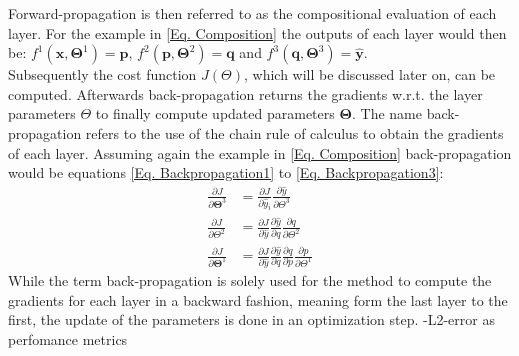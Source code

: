 \documentclass[12pt, a4paper]{article}
\begin{document}
\noindent
Forward-propagation is then referred to as the compositional evaluation of each layer. For the example in \cref{Eq. Composition} the outputs of each layer would then be:  \(f^1(\mathbf{x},\mathbf{\Theta}^1) = \mathbf{p}\), \(f^2(\mathbf{p},\mathbf{\Theta}^2) = \mathbf{q}\) and \(f^3(\mathbf{q},\mathbf{\Theta}^3) = \mathbf{\hat{y}}\).\\
Subsequently the cost function \(J(\Theta)\), which will be discussed later on, can be computed. Afterwards back-propagation returns the gradients w.r.t. the layer parameters \(\Theta\) to finally compute updated parameters \(\mathbf{\Theta}\).  The name back-propagation refers to the use of the chain rule of calculus to obtain the gradients of each layer. Assuming again the example in \cref{Eq. Composition} back-propagation would be equations \cref{Eq. Backpropagation1} to \cref{Eq. Backpropagation3}:
\begin{align}
	\frac{\partial J}{\partial \mathbf{\Theta}^3} &= \frac{\partial J}{\partial\hat{y}_i}\frac{\partial\hat{y}}{\partial \Theta^3}
\label{Eq. Backpropagation3}\\
	\frac{\partial J}{\partial \Theta^2} &= \frac{\partial J}{\partial\hat{y}}\frac{\partial\hat{y}}{\partial q}\frac{\partial q}{\partial \Theta^2}
\label{Eq. Backpropagation2}\\
	\frac{\partial J}{\partial \mathbf{\Theta}^1} &= \frac{\partial J}{\partial\hat{y}}\frac{\partial\hat{y}}{\partial q}\frac{\partial q}{\partial p}\frac{\partial p}{\partial \Theta^1}
\label{Eq. Backpropagation1}
\end{align}
While the term back-propagation is solely used for the method to compute the gradients for each layer in a backward fashion, meaning form the last layer to the first, the update of the parameters is done in an optimization step.
-L2-error as perfomance metrics
\end{document}
